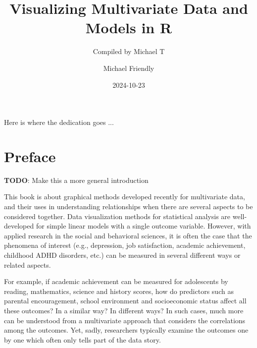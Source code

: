 \documentclass[
  letterpaper,
  10pt,
  krantz2]{krantz}
\title{Visualizing Multivariate Data and Models in R}
\subtitle{Compiled by Michael T}
\author{Michael Friendly}
\date{2024-10-23}
\renewcommand*\contentsname{Table of contents}
\newcommand\contentsname{Table of contents}
\begin{document}
\maketitle


\thispagestyle{empty}

\begin{center}
Here is where the dedication goes ...
\end{center}

\setlength{\abovedisplayskip}{-5pt}
\setlength{\abovedisplayshortskip}{-5pt}


\renewcommand*\contentsname{Table of contents}
{
\hypersetup{linkcolor=}
\setcounter{tocdepth}{2}
\tableofcontents
}


\chapter*{Preface}\label{preface}


\textbf{TODO}: Make this a more general introduction

This book is about graphical methods developed recently for multivariate
data, and their uses in understanding relationships when there are
several aspects to be considered together. Data visualization methods
for statistical analysis are well-developed for simple linear models
with a single outcome variable. However, with applied research in the
social and behavioral sciences, it is often the case that the phenomena
of interest (e.g., depression, job satisfaction, academic achievement,
childhood ADHD disorders, etc.) can be measured in several different
ways or related aspects.

For example, if academic achievement can be measured for adolescents by
reading, mathematics, science and history scores, how do predictors such
as parental encouragement, school environment and socioeconomic status
affect all these outcomes? In a similar way? In different ways? In such
cases, much more can be understood from a multivariate approach that
considers the correlations among the outcomes. Yet, sadly, researchers
typically examine the outcomes one by one which often only tells part of
the data story.
\end{document}
